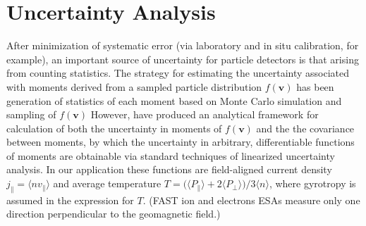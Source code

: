 
\chapter{Uncertainty Analysis}
\label{app:A}

  After minimization of systematic error (via laboratory and in situ
  calibration, for example), an important source of uncertainty for
  particle detectors is that arising from counting
  statistics. The strategy for estimating the uncertainty
  associated with moments derived from a sampled particle distribution
  $f ( \mathbf{v} ) $ has been generation of statistics of each moment based
  on Monte Carlo simulation and sampling of $f(\mathbf{v})$ \citep[e.g.][]{Paschmann1998,Gershman2013}
  However, \citet{Gershman2015} have produced an analytical framework
  for calculation of both the uncertainty in moments of $f (
  \mathbf{v} ) $ and the the covariance between moments, by which the
  uncertainty in arbitrary, differentiable functions of moments are
  obtainable via standard techniques of linearized uncertainty
  analysis. In our application these functions are field-aligned
  current density $j_\parallel = \langle n v_\parallel \rangle$ and
  average temperature $T = \big ( \langle P_{\parallel} \rangle + 2
  \langle P_{\perp} \rangle \big ) \big / 3 \langle n \rangle $, where
  gyrotropy is assumed in the expression for $T$. (FAST ion and
  electrons ESAs measure only one direction perpendicular to the
  geomagnetic field.)


